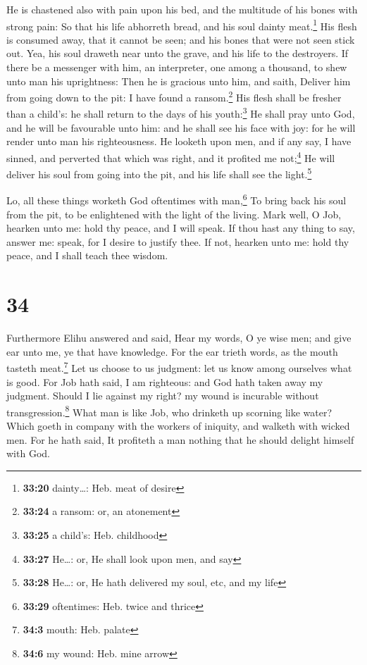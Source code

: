  He is chastened also with pain upon his bed, and the
multitude of his bones with strong pain:  So that his
life abhorreth bread, and his soul dainty meat.\footnote{\textbf{33:20}
  dainty\ldots: Heb. meat of desire}  His flesh is
consumed away, that it cannot be seen; and his bones that were not seen
stick out.  Yea, his soul draweth near unto the grave,
and his life to the destroyers.  If there be a messenger
with him, an interpreter, one among a thousand, to shew unto man his
uprightness:  Then he is gracious unto him, and saith,
Deliver him from going down to the pit: I have found a
ransom.\footnote{\textbf{33:24} a ransom: or, an atonement}
 His flesh shall be fresher than a child's: he shall
return to the days of his youth:\footnote{\textbf{33:25} a child's: Heb.
  childhood}  He shall pray unto God, and he will be
favourable unto him: and he shall see his face with joy: for he will
render unto man his righteousness.  He looketh upon men,
and if any say, I have sinned, and perverted that which was right, and
it profited me not;\footnote{\textbf{33:27} He\ldots: or, He shall look
  upon men, and say}  He will deliver his soul from going
into the pit, and his life shall see the light.\footnote{\textbf{33:28}
  He\ldots: or, He hath delivered my soul, etc, and my life}

 Lo, all these things worketh God oftentimes with
man,\footnote{\textbf{33:29} oftentimes: Heb. twice and thrice}
 To bring back his soul from the pit, to be enlightened
with the light of the living.  Mark well, O Job, hearken
unto me: hold thy peace, and I will speak.  If thou hast
any thing to say, answer me: speak, for I desire to justify thee.
 If not, hearken unto me: hold thy peace, and I shall
teach thee wisdom.

\hypertarget{section-33}{%
\section{34}\label{section-33}}

 Furthermore Elihu answered and said,  Hear
my words, O ye wise men; and give ear unto me, ye that have knowledge.
 For the ear trieth words, as the mouth tasteth
meat.\footnote{\textbf{34:3} mouth: Heb. palate}  Let us
choose to us judgment: let us know among ourselves what is good.
 For Job hath said, I am righteous: and God hath taken
away my judgment.  Should I lie against my right? my wound
is incurable without transgression.\footnote{\textbf{34:6} my wound:
  Heb. mine arrow}  What man is like Job, who drinketh up
scorning like water?  Which goeth in company with the
workers of iniquity, and walketh with wicked men.  For he
hath said, It profiteth a man nothing that he should delight himself
with God.

